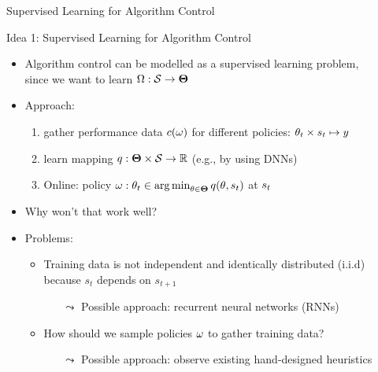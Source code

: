 \begin{frame}[c]{Supervised Learning for Algorithm Control}


\begin{block}{Idea 1: Supervised Learning for Algorithm Control}
\begin{itemize}
  \item Algorithm control can be modelled as a supervised learning problem,\\ since we want to learn $\Omega: \mathcal{S} \to \mathbf{\Theta}$
  \item Approach:
  \begin{enumerate}
    \item gather performance data $c(\omega)$ for different policies: $ \mathbf{\theta}_t \times s_t \mapsto y$
    \pause
    \item learn mapping $q: \mathbf{\Theta} \times \mathcal{S} \to \mathbb{R}$ (e.g., by using DNNs)
    \pause
    \item Online: policy $\omega: \mathbf{\theta}_t \in \operatorname*{arg\,min}_{\mathbf{\theta} \in \mathbf{\Theta}} q(\mathbf{\theta}, s_t)$ at $s_t$
  \end{enumerate}
  \medskip
  \pause
  \item Why won't that work well? \hands
  \pause
  \item Problems:
  \begin{itemize}
    \item Training data is not independent and identically distributed (i.i.d)\\
    because $s_t$ depends on $s_{t+1}$ 
    \begin{itemize}
      \item[$\leadsto$] Possible approach: recurrent neural networks (RNNs) 
    \end{itemize}
    \pause
    \item How should we sample policies $\omega$ to gather training data?
    \begin{itemize}
      \item[$\leadsto$] Possible approach: observe existing hand-designed heuristics
    \end{itemize}
  \end{itemize}
\end{itemize}
\end{block}

\end{frame}
